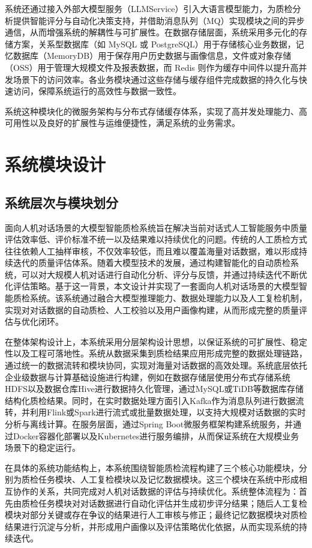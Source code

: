 系统还通过接入外部大模型服务（LLMService）引入大语言模型能力，为质检分析提供智能评分与自动化决策支持，并借助消息队列（MQ）实现模块之间的异步通信，从而增强系统的解耦性与可扩展性。在数据存储层面，系统采用多元化的存储方案，关系型数据库（如 MySQL 或 PostgreSQL）用于存储核心业务数据，记忆数据库（MemoryDB）用于保存用户历史数据与画像信息，文件或对象存储（OSS）用于管理大规模文件及报表数据，而 Redis 则作为缓存中间件以提升高并发场景下的访问效率。各业务模块通过这些存储与缓存组件完成数据的持久化与快速访问，保障系统运行的高效性与数据一致性。

系统这种模块化的微服务架构与分布式存储缓存体系，实现了高并发处理能力、高可用性以及良好的扩展性与运维便捷性，满足系统的业务需求。
\section{系统模块设计}
\subsection{系统层次与模块划分}
面向人机对话场景的大模型智能质检系统旨在解决当前对话式人工智能服务中质量评估效率低、评价标准不统一以及结果难以持续优化的问题。传统的人工质检方式往往依赖人工抽样审核，不仅效率较低，而且难以覆盖海量对话数据，难以形成持续迭代的质量评估体系。随着大模型技术的发展，通过构建智能化的自动质检系统，可以对大规模人机对话进行自动化分析、评分与反馈，并通过持续迭代不断优化评估策略。基于这一背景，本文设计并实现了一套面向人机对话场景的大模型智能质检系统。该系统通过融合大模型推理能力、数据处理能力以及人工复检机制，实现对对话数据的自动质检、人工校验以及用户画像构建，从而形成完整的质量评估与优化闭环。

在整体架构设计上，本系统采用分层架构设计思想，以保证系统的可扩展性、稳定性以及工程可落地性。系统从数据采集到质检结果应用形成完整的数据处理链路，通过统一的数据流转和模块协同，实现对海量对话数据的高效处理。系统底层依托企业级数据与计算基础设施进行构建，例如在数据存储层使用分布式存储系统HDFS以及数据仓库Hive进行数据持久化管理，通过MySQL或TiDB等数据库存储结构化质检结果。同时，在实时数据处理方面引入Kafka作为消息队列进行数据流转，并利用Flink或Spark进行流式或批量数据处理，以支持大规模对话数据的实时分析与离线计算。在服务层面，通过Spring Boot微服务框架构建系统服务，并通过Docker容器化部署以及Kubernetes进行服务编排，从而保证系统在大规模业务场景下的稳定运行。

在具体的系统功能结构上，本系统围绕智能质检流程构建了三个核心功能模块，分别为质检任务模块、人工复检模块以及记忆数据模块。这三个模块在系统中形成相互协作的关系，共同完成对人机对话数据的评估与持续优化。系统整体流程为：首先由质检任务模块对对话数据进行自动化评估并生成初步评分结果；随后人工复检模块对部分关键或存在争议的结果进行人工审核与修正；最终记忆数据模块对质检结果进行沉淀与分析，并形成用户画像以及评估策略优化依据，从而实现系统的持续迭代。

